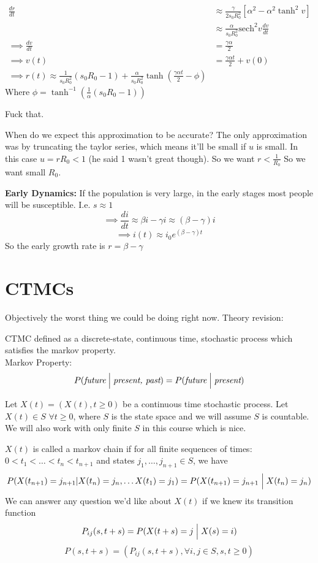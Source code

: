 \documentclass{/home/janmebows/Documents/LatexTemplates/myassignment}
\begin{document}
\begin{align*}
    \frac{dr}{dt}&\approx \frac{\gamma}{2s_0R_0^2} \left[\alpha^2 - \alpha^2 \tanh^2v\right]\\
    &\approx \frac{\alpha}{s_0R_0^2} \text{sech}^2v \frac{dv}{dt}\\
    \implies \frac{dv}{dt} &= \frac{\gamma \alpha}{2}\\
    \implies v(t) &= \frac{\gamma\alpha t}{2} + v(0)\\
    \implies r(t) \approx \frac{1}{s_0R_0^2} (s_0R_0-1) + \frac{\alpha}{s_0R_0^2} \tanh \left(\frac{\gamma\alpha t}{2} - \phi\right)
\end{align*}
Where $\phi = \tanh^{-1}(\frac1\alpha (s_0R_0-1))$

Fuck that.

When do we expect this approximation to be accurate?
The only approximation was by truncating the taylor series, which means it'll be small if $u$ is small. In this case $u = rR_0 < 1$ (he said 1 wasn't great though). So we want $r < \frac{1}{R_0}$
So we want small $R_0$. 


\textbf{Early Dynamics:}
If the population is very large, in the early stages most people will be susceptible. I.e. $s\approx 1$
\[\implies \frac{di}{dt} \approx \beta i -\gamma i \approx (\beta-\gamma)i\]
\[\implies i(t) \approx i_0 e^{(\beta-\gamma)t}\]
So the early growth rate is $r = \beta-\gamma$


\section{CTMCs}
Objectively the worst thing we could be doing right now.
Theory revision:

CTMC defined as a discrete-state, continuous time, stochastic process which satisfies the markov property.\\
Markov Property:
\[P(\textit{future}\Bigm| \textit{present, past}) = P(\textit{future}\Bigm| \textit{present}) \]

Let $X(t) = (X(t),t\geq 0)$ be a continuous time stochastic process. Let $X(t) \in S$ $\forall t \geq 0$, where $S$ is the state space and we will assume $S$ is countable. We will also work with only finite $S$ in this course which is nice.

$X(t)$ is called a markov chain if for all finite sequences of times: $0<t_1<\hdots<t_n<t_{n+1}$ and states $j_1,\hdots,j_{n+1} \in S$, we have
\[P(X(t_{n+1}) = j_{n+1} | X(t_n) = j_n, \hdots X(t_1) = j_1) = P(X(t_{n+1}) = j_{n+1} \Bigm| X(t_n) = j_n)\]
We can answer any question we'd like about $X(t)$ if we knew its transition function
\[P_{ij}(s,t+s) = P(X(t+s)=j \Bigm| X(s) = i)\]
\[P(s,t+s) = (P_{ij}(s,t+s), \forall i,j\in S,s,t \geq 0 )\]
\end{document}
